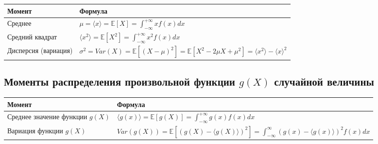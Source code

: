 \documentclass[
  russian,
  12pt,
  a4paper,
  a4paper,
  openany]{scrbook}
\newcounter{none} %
\begin{document}
{\def\LTcaptype{none} %
\begin{longtable}[]{@{}
  >{\centering\arraybackslash}p{}
  >{\centering\arraybackslash}p{}@{}}
\toprule\noalign{}
\begin{minipage}[b]{\linewidth}\centering
Момент
\end{minipage} & \begin{minipage}[b]{\linewidth}\centering
Формула
\end{minipage} \\
\midrule\noalign{}
\endhead
\bottomrule\noalign{}
\endlastfoot
Среднее &
\(\mu=\langle x\rangle=\mathbb{E}[X]=\int_{-\infty}^{+\infty} xf(x)dx\) \\
Средний квадрат &
\(\langle x^2\rangle=\mathbb{E}[X^2]=\int_{-\infty}^{+\infty} x^2 f(x)dx\) \\
Дисперсия (вариация) &
\(\sigma^2=Var(X)=\mathbb{E}\left[(X-\mu)^2\right]=\mathbb{E}\left[X^2-2\mu X+\mu^2\right]=\langle x^2 \rangle-\langle x\rangle^2\) \\
\end{longtable}
}

\subsection{\texorpdfstring{Моменты распределения произвольной функции
\(g(X)\) случайной
величины}{Моменты распределения произвольной функции g(X) случайной величины}}\label{ux43cux43eux43cux435ux43dux442ux44b-ux440ux430ux441ux43fux440ux435ux434ux435ux43bux435ux43dux438ux44f-ux43fux440ux43eux438ux437ux432ux43eux43bux44cux43dux43eux439-ux444ux443ux43dux43aux446ux438ux438-gx-ux441ux43bux443ux447ux430ux439ux43dux43eux439-ux432ux435ux43bux438ux447ux438ux43dux44b}

{\def\LTcaptype{none} %
\begin{longtable}[]{@{}
  >{\centering\arraybackslash}p{}
  >{\centering\arraybackslash}p{}@{}}
\toprule\noalign{}
\begin{minipage}[b]{\linewidth}\centering
Момент
\end{minipage} & \begin{minipage}[b]{\linewidth}\centering
Формула
\end{minipage} \\
\midrule\noalign{}
\endhead
\bottomrule\noalign{}
\endlastfoot
Среднее значение функции \(g(X)\) &
\(\langle g(x)\rangle=\mathbb{E}\left[g(X)\right]=\int_{-\infty}^{+\infty} g(x)f(x)dx\) \\
Вариация функции \(g(X)\) &
\(Var(g(X))=\mathbb{E}\left[(g(X)-\langle g(X)\rangle)^2\right]= \int_{-\infty}^\infty \left(g(x)-\langle g(x)\rangle\right)^2 f(x) dx\) \\
\end{longtable}
}
\end{document}
